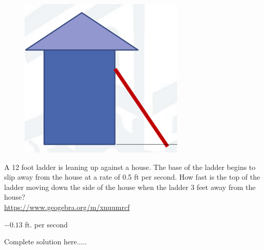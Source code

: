 \begin{figure}
\includegraphics[width=0.7\textwidth]{images/implicitDiff/houseLadder.PNG}
\end{figure}
\hfill \break
\vspace{-0.5in}
\begin{example}
A 12 foot ladder is leaning up against a house. The base of the ladder begins to slip away from the house at a rate of 0.5 ft per second. How fast is the top of the ladder moving down the side of the house when the ladder 3 feet away from the house?\\
\url{https://www.geogebra.org/m/xnuumrcf}
    \begin{sol}
    $-0.13$ ft. per second
    \end{sol}
    \begin{solL}
    Complete solution here.....
    
    \end{solL}
    
\end{example}
\newpage

